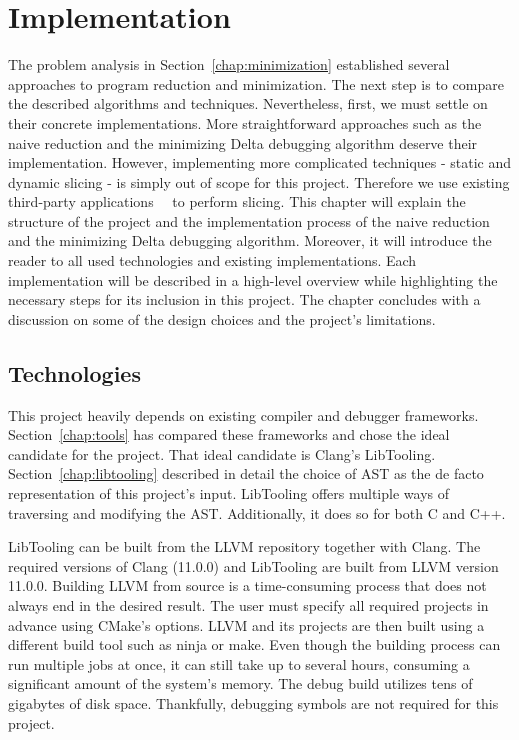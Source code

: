 \chapter{Implementation}\label{chap:implementation}

The problem analysis in Section~\ref{chap:minimization} established several 
approaches to program reduction and minimization. 
The next step is to compare the described algorithms and techniques. 
Nevertheless, first, we must settle on their concrete implementations. 
More straightforward approaches such as the naive reduction and 
the minimizing Delta debugging algorithm deserve their implementation. 
However, implementing more complicated techniques - static and dynamic 
slicing - is simply out of scope for this project.
Therefore we use existing third-party 
applications~\citep{Chalupa20}~\citep{Sahoo13} to perform slicing.
This chapter will explain the structure of the project and the implementation 
process of the naive reduction and the minimizing Delta debugging algorithm. 
Moreover, it will introduce the reader to all used technologies and existing 
implementations. 
Each implementation will be described in a high-level overview while 
highlighting the necessary steps for its inclusion in this project. 
The chapter concludes with a discussion on some of the design choices and 
the project's limitations.

\section{Technologies}

This project heavily depends on existing compiler and debugger frameworks. 
Section~\ref{chap:tools} has compared these frameworks and chose the ideal 
candidate for the project. 
That ideal candidate is Clang's LibTooling. 
Section~\ref{chap:libtooling} described in detail the choice of AST as 
the de facto representation of this project's input. 
LibTooling offers multiple ways of traversing and modifying the AST. 
Additionally, it does so for both C and C++.

LibTooling can be built from the LLVM repository together with Clang.
The required versions of Clang (11.0.0) and LibTooling are built from LLVM 
version 11.0.0.
Building LLVM from source is a time-consuming process that does not always 
end in the desired result.
The user must specify all required projects in advance using CMake's options.
LLVM and its projects are then built using a different build tool such as 
ninja or make.
Even though the building process can run multiple jobs at once, it can still 
take up to several hours, consuming a significant amount of the system's 
memory.
The debug build utilizes tens of gigabytes of disk space.
Thankfully, debugging symbols are not required for this project.

